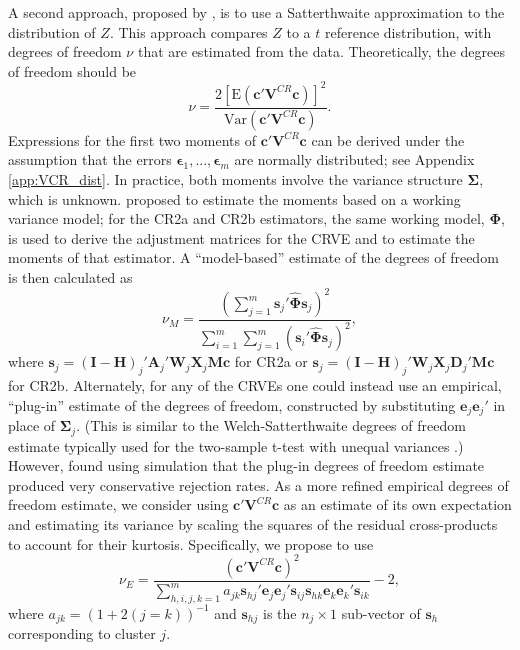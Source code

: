 \documentclass[12pt]{article}\usepackage[]{graphicx}\usepackage[]{color}
\newcommand{\E}{\text{E}}
\newcommand{\Var}{\text{Var}}
\newcommand{\bm}{\mathbf}
\newcommand{\bs}{\boldsymbol}
\begin{document}
A second approach, proposed by \citet{McCaffrey2001generalizations}, is to use a Satterthwaite approximation \citep{Satterthwaite1946approximate} to the distribution of $Z$.
This approach compares $Z$ to a $t$ reference distribution, with degrees of freedom $\nu$ that are estimated from the data. 
Theoretically, the degrees of freedom should be 
\begin{equation}
\label{eq:nu_Satterthwaite}
\nu = \frac{2\left[\E\left(\bm{c}'\bm{V}^{CR}\bm{c}\right)\right]^2}{\Var\left(\bm{c}'\bm{V}^{CR}\bm{c}\right)}.
\end{equation}
Expressions for the first two moments of $\bm{c}'\bm{V}^{CR}\bm{c}$ can be derived under the assumption that the errors $\bs\epsilon_1,...,\bs\epsilon_m$ are normally distributed; see Appendix \ref{app:VCR_dist}. 
In practice, both moments involve the variance structure $\bs\Sigma$, which is unknown. 
\citet{McCaffrey2001generalizations} proposed to estimate the moments based on a working variance model; for the CR2a and CR2b estimators, the same working model, $\bs\Phi$, is used to derive the adjustment matrices for the CRVE and to estimate the moments of that estimator. 
A ``model-based'' estimate of the degrees of freedom is then calculated as 
\begin{equation}
\nu_{M} = \frac{\left(\sum_{j=1}^m \bm{s}_j' \hat{\bs\Phi} \bm{s}_j\right)^2}{\sum_{i=1}^m \sum_{j=1}^m \left(\bm{s}_i' \hat{\bs\Phi} \bm{s}_j\right)^2},
\end{equation}
where $\bm{s}_j = \left(\bm{I} - \bm{H}\right)_j'\bm{A}_j'\bm{W}_j\bm{X}_j\bm{M}\bm{c}$ for CR2a or $\bm{s}_j = \left(\bm{I} - \bm{H}\right)_j'\bm{W}_j\bm{X}_j\bm{D}_j'\bm{M}\bm{c}$ for CR2b. 
Alternately, for any of the CRVEs one could instead use an empirical, ``plug-in'' estimate of the degrees of freedom, constructed by substituting $\bm{e}_j \bm{e}_j'$ in place of $\bs\Sigma_j$. 
(This is similar to the Welch-Satterthwaite degrees of freedom estimate typically used for the two-sample t-test with unequal variances \citep{Satterthwaite1946approximate}.) 
However, \citet{Bell2002bias} found using simulation that the plug-in degrees of freedom estimate produced very conservative rejection rates. 
As a more refined empirical degrees of freedom estimate, we consider using $\bm{c}'\bm{V}^{CR}\bm{c}$ as an estimate of its own expectation and estimating its variance by scaling the squares of the residual cross-products to account for their kurtosis. 
Specifically, we propose to use 
\begin{equation}
\nu_{E} = \frac{\left(\bm{c}'\bm{V}^{CR}\bm{c}\right)^2}{\sum_{h,i,j,k=1}^m a_{jk}\bm{s}_{hj}' \bm{e}_j \bm{e}_j' \bm{s}_{ij} \bm{s}_{hk} \bm{e}_k \bm{e}_k' \bm{s}_{ik}} - 2,
\end{equation}
where $a_{jk} = \left(1 + 2(j=k)\right)^{-1}$ and $\bm{s}_{hj}$ is the $n_j \times 1$ sub-vector of $\bm{s}_h$ corresponding to cluster $j$. 
\end{document}
